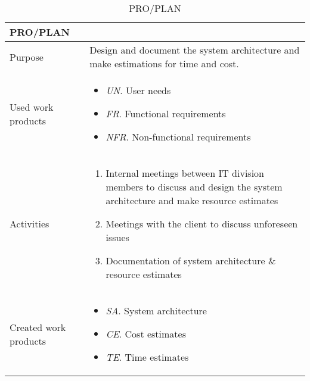 \begin{table}[h!]
\begin{tabular}{l|p{}}
\hline
\textbf{PRO/PLAN}        & \textbf{} \\ \hline
Purpose & Design and document the system architecture and make estimations for time and cost.   \\ \hline
Used work products    &      
\begin{itemize}
    \item \textit{UN}. User needs
    \item \textit{FR}. Functional requirements
    \item \textit{NFR}. Non-functional requirements
\end{itemize}
\\ \hline
Activities            &   
\begin{enumerate}
    \item Internal meetings between IT division members to discuss and design the system architecture and make resource estimates
    \item Meetings with the client to discuss unforeseen issues
    \item Documentation of system architecture \& resource estimates
\end{enumerate}
\\ \hline
Created work products &     
\begin{itemize}
    \item \textit{SA}. System architecture
    \item \textit{CE}. Cost estimates
    \item \textit{TE}. Time estimates
\end{itemize}
\end{tabular}
\caption{PRO/PLAN}
\label{pro/plan}
\end{table}

\newpage


